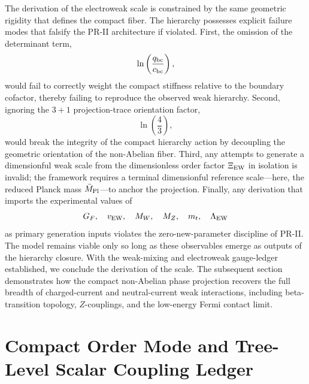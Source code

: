 \documentclass[11pt]{article}
\begin{document}
The derivation of the electroweak scale is constrained by the same geometric rigidity that defines the compact fiber. The hierarchy possesses explicit failure modes that falsify the PR-II architecture if violated. First, the omission of the determinant term,
\begin{equation}
\ln \left( \frac{q_{\rm bc}}{c_{\rm bc}} \right),
\end{equation}
would fail to correctly weight the compact stiffness relative to the boundary cofactor, thereby failing to reproduce the observed weak hierarchy. Second, ignoring the \(3+1\) projection-trace orientation factor,
\begin{equation}
\ln\left(\frac43\right),
\end{equation}
would break the integrity of the compact hierarchy action by decoupling the geometric orientation of the non-Abelian fiber. Third, any attempts to generate a dimensionful weak scale from the dimensionless order factor \(\Xi_{\rm EW}\) in isolation is invalid; the framework requires a terminal dimensionful reference scale—here, the reduced Planck mass \(\bar M_{\rm Pl}\)—to anchor the projection. Finally, any derivation that imports the experimental values of 
\begin{equation}
G_F,
\quad
v_{\rm EW},
\quad
M_W,
\quad
M_Z,
\quad
m_t,
\quad
\Lambda_{\rm EW}
\end{equation}
as primary generation inputs violates the zero-new-parameter discipline of PR-II. The model remains viable only so long as these observables emerge as outputs of the hierarchy closure. With the weak-mixing and electroweak gauge-ledger established, we conclude the derivation of the scale. The subsequent section demonstrates how the compact non-Abelian phase projection recovers the full breadth of charged-current and neutral-current weak interactions, including beta-transition topology, \(Z\)-couplings, and the low-energy Fermi contact limit.

\section{Compact Order Mode and Tree-Level Scalar Coupling Ledger}
\label{sec:pr2_compact_order_mode_scalar_ledger}
\end{document}
